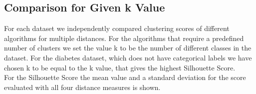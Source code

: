 \subsection{Comparison for Given k Value}
For each dataset we independently compared clustering scores of different algorithms for multiple distances. For the algorithms that require a predefined number of clusters we set the value k to be the number of different classes in the dataset. For the diabetes dataset, which does not have categorical labels we have chosen k to be equal to the k value, that gives the highest Silhouette Score. \\
For the Silhouette Score the mean value and a standard deviation for the score evaluated with all four distance measures is shown. 

\begin{figure}[H]
	\centering
	\qquad
	\qquad
	\qquad

\end{figure}
